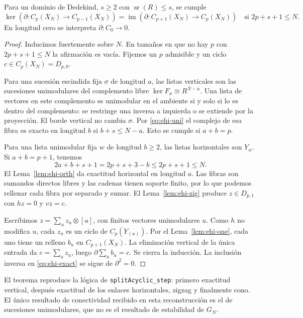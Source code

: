 \begin{teorema}
\label{thm:ehi-acyclic}
Para un dominio de Dedekind, $s\ge2$ con $\operatorname{sr}(R)\le s$, se cumple
\begin{equation}
 \ker(\partial:C_p(X_N)\to C_{p-1}(X_N))
 =\operatorname{im}(\partial:C_{p+1}(X_N)\to C_p(X_N))
 \quad\text{si }2p+s+1\le N.
 \label{eq:ehi-exact}
\end{equation}
En longitud cero se interpreta $\partial:C_0\to0$.
\end{teorema}
\begin{proof}
Inducimos fuertemente sobre $N$. En tamaños en que no hay $p$ con $2p+s+1\le N$ la afirmación es vacía. Fijemos un $p$ admisible y un ciclo $c\in C_p(X_N)=D_{p,0}$.

Para una sucesión escindida fija $\sigma$ de longitud $a$, las listas verticales son las sucesiones unimodulares del complemento libre $\ker F_\sigma\cong R^{N-a}$. Una lista de vectores en este complemento es unimodular en el ambiente si y solo si lo es dentro del complemento: se restringe una inversa a izquierda o se extiende por la proyección. El borde vertical no cambia $\sigma$. Por \eqref{eq:ehi-uni} el complejo de esa fibra es exacto en longitud $b$ si $b+s\le N-a$. Esto se cumple si $a+b=p$.

Para una lista unimodular fija $w$ de longitud $b\ge2$, las listas horizontales son $Y_w$. Si $a+b=p+1$, tenemos
\[
 2a+b+s+1=2p+s+3-b\le2p+s+1\le N.
\]
El Lema~\ref{lem:ehi-orth} da exactitud horizontal en longitud $a$. Las fibras son sumandos directos libres y las cadenas tienen soporte finito, por lo que podemos rellenar cada fibra por separado y sumar. El Lema~\ref{lem:ehi-zig} produce $z\in D_{p,1}$ con $hz=0$ y $vz=c$.

Escribimos $z=\sum_u z_u\otimes[u]$, con finitos vectores unimodulares $u$. Como $h$ no modifica $u$, cada $z_u$ es un ciclo de $C_p(Y_{(u)})$. Por el Lema~\ref{lem:ehi-one}, cada uno tiene un relleno $b_u$ en $C_{p+1}(X_N)$. La eliminación vertical de la única entrada da $c=\sum_u z_u$, luego $\partial\sum_u b_u=c$. Se cierra la inducción. La inclusión inversa en \eqref{eq:ehi-exact} se sigue de $\partial^2=0$.
\end{proof}

El teorema reproduce la lógica de \texttt{splitAcyclic\_step}: primero exactitud vertical, después exactitud de los enlaces horizontales, zigzag y finalmente cono. El único resultado de conectividad recibido en esta reconstrucción es el de sucesiones unimodulares, que no es el resultado de estabilidad de $G_N$.

